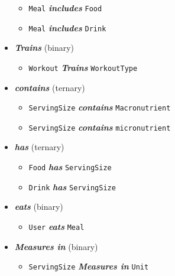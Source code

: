 \documentclass[letterpaper, 11pt]{article}
\newcommand{\1}{\mathds{1}}	%
\theoremstyle{definition}
\begin{document}
\begin{itemize}
            \begin{itemize}[label=$\circ$]
                \item \texttt{Meal} \textit{\textbf{includes}} \texttt{Food}
                \item \texttt{Meal} \textit{\textbf{includes}} \texttt{Drink}
            \end{itemize}
        \item \textit{\textbf{Trains}} (binary)
            \begin{itemize}[label=$\circ$] 
                \item \texttt{Workout}  \textit{\textbf{Trains}} \texttt{WorkoutType}
            \end{itemize}
        \item \textit{\textbf{contains}} (ternary)
            \begin{itemize}[label=$\circ$]
                \item        \texttt{ServingSize} \textit{\textbf{contains}} \texttt{Macronutrient}
                \item            \texttt{ServingSize} \textit{\textbf{contains}} \texttt{micronutrient}
            \end{itemize}
        \item \textit{\textbf{has}} (ternary)
            \begin{itemize}[label=$\circ$]
                \item \texttt{Food} \textit{\textbf{has}} \texttt{ServingSize}
                \item \texttt{Drink} \textit{\textbf{has}} \texttt{ServingSize}
            \end{itemize}
        \item \textit{\textbf{eats}} (binary)
            \begin{itemize}[label=$\circ$]
                \item \texttt{User} \textit{\textbf{eats}} \texttt{Meal}
            \end{itemize}
        \item \textit{\textbf{Measures in}} (binary)
            \begin{itemize}[label=$\circ$]
                \item \texttt{ServingSize} \textit{\textbf{Measures in}} \texttt{Unit}
            \end{itemize}
        \end{itemize}
\end{document}
